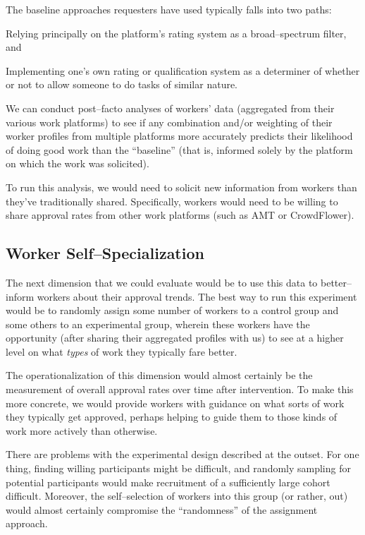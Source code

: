 \documentclass[11pt]{article}
\begin{document}
The baseline approaches requesters have used typically falls into two paths:
\begin{enumerate*}
  \item Relying principally on the platform's rating system as a broad--spectrum filter, and
  \item Implementing one's own rating or qualification system as a determiner of
        whether or not to allow someone to do tasks of similar nature.
\end{enumerate*}

We can conduct post--facto analyses of workers' data
(aggregated from their various work platforms) to see
if any combination and/or weighting of their
worker profiles from multiple platforms
more accurately predicts their likelihood of doing good work than the ``baseline''
(that is, informed solely by the platform on which the work was solicited).

To run this analysis, we would need to solicit new information from workers
than they've traditionally shared.
Specifically,
workers would need to be willing to share approval rates from other work platforms
(such as AMT or CrowdFlower).

\subsection*{Worker Self--Specialization}
The next dimension that we could evaluate would be
to use this data to better--inform workers about their approval trends.
The best way to run this experiment would be
to randomly assign some number of workers to a control group and
some others to an experimental group, wherein these workers have the opportunity
(after sharing their aggregated profiles with us)
to see at a higher level on what \textit{types} of work they typically fare better.

The operationalization of this dimension would almost certainly be
the measurement of overall approval rates over time after intervention.
To make this more concrete, we would provide workers with guidance on what
sorts of work they typically get approved, perhaps
helping to guide them to those kinds of work more actively than otherwise.

There are problems with the experimental design described at the outset.
For one thing, finding willing participants might be difficult, and
randomly sampling for potential participants would make
recruitment of a sufficiently large cohort difficult.
Moreover, the self--selection of workers into this group
(or rather, out)
would almost certainly compromise the ``randomness'' of the assignment approach.
\end{document}
